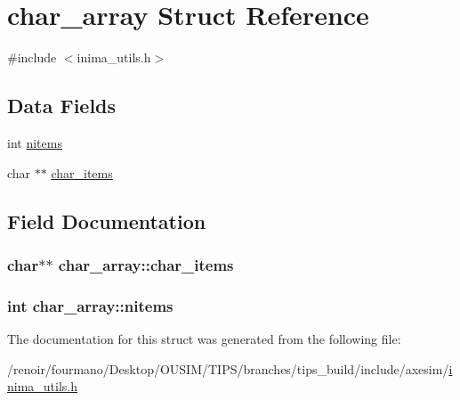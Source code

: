 \hypertarget{structchar__array}{
\section{char\_\-array Struct Reference}
\label{structchar__array}
}


{\ttfamily \#include $<$inima\_\-utils.h$>$}\subsection*{Data Fields}
\begin{DoxyCompactItemize}
\item 
int \hyperlink{structchar__array_ae2389996d16d5042051c140ce66db2ad}{nitems}
\item 
char $\ast$$\ast$ \hyperlink{structchar__array_a87868716aa2096e6891988b6a19f5e78}{char\_\-items}
\end{DoxyCompactItemize}


\subsection{Field Documentation}
\hypertarget{structchar__array_a87868716aa2096e6891988b6a19f5e78}{
\subsubsection[{char\_\-items}]{\setlength{\rightskip}{0pt plus 5cm}char$\ast$$\ast$ {\bf char\_\-array::char\_\-items}}}
\label{structchar__array_a87868716aa2096e6891988b6a19f5e78}
\hypertarget{structchar__array_ae2389996d16d5042051c140ce66db2ad}{
\subsubsection[{nitems}]{\setlength{\rightskip}{0pt plus 5cm}int {\bf char\_\-array::nitems}}}
\label{structchar__array_ae2389996d16d5042051c140ce66db2ad}


The documentation for this struct was generated from the following file:\begin{DoxyCompactItemize}
\item 
/renoir/fourmano/Desktop/OUSIM/TIPS/branches/tips\_\-build/include/axesim/\hyperlink{inima__utils_8h}{inima\_\-utils.h}\end{DoxyCompactItemize}
